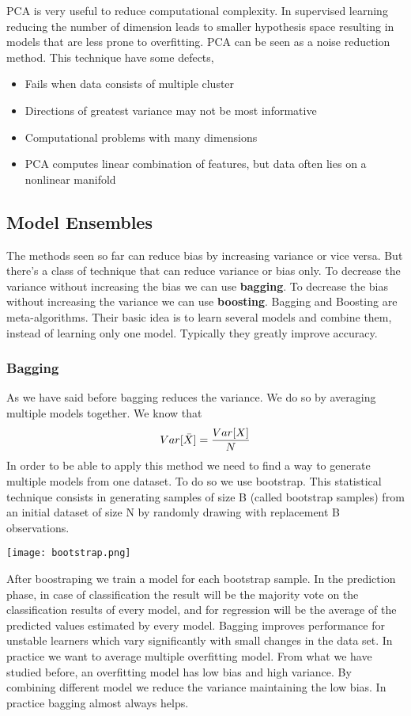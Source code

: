\documentclass[main.tex]{subfiles}
\begin{document}
PCA is very useful to reduce computational complexity. In supervised learning reducing the number of dimension leads to smaller hypothesis space resulting in models that are less prone to overfitting. PCA can be seen as a noise reduction method.
This technique have some defects,
\begin{itemize}
    \item Fails when data consists of multiple cluster
    \item Directions of greatest variance may not be most informative
    \item Computational problems with many dimensions
    \item PCA computes linear combination of features, but data often lies on a nonlinear manifold
\end{itemize}

\subsection{Model Ensembles}
The methods seen so far can reduce bias by increasing variance or vice versa. But there's a class of technique that can reduce variance or bias only.
To decrease the variance without increasing the bias we can use \textbf{bagging}.
To decrease the bias without increasing the variance we can use \textbf{boosting}.
Bagging and Boosting are meta-algorithms. Their basic idea is to learn several models and combine them, instead of learning only one model. Typically they greatly improve accuracy.

\subsubsection{Bagging}
As we have said before bagging reduces the variance. We do so by averaging multiple models together. We know that
\begin{equation}
    Var[\Bar{X}] = \frac{Var[X]}{N}
\end{equation}
In order to be able to apply this method we need to find a way to generate multiple models from one dataset. To do so we use bootstrap.
This statistical technique consists in generating samples of size B (called bootstrap samples) from an initial dataset of size N by randomly drawing with replacement B observations.
\begin{center}
    \texttt{[image: bootstrap.png]}
\end{center}
After boostraping we train a model for each bootstrap sample. In the prediction phase, in case of classification the result will be the majority vote on the classification results of every model, and for regression will be the average of the predicted values estimated by every model. Bagging improves performance for unstable learners which vary significantly with small changes in the data set. In practice we want to average multiple overfitting model. From what we have studied before, an overfitting model has low bias and high variance. By combining different model we reduce the variance maintaining the low bias. In practice bagging almost always helps. 
\end{document}
